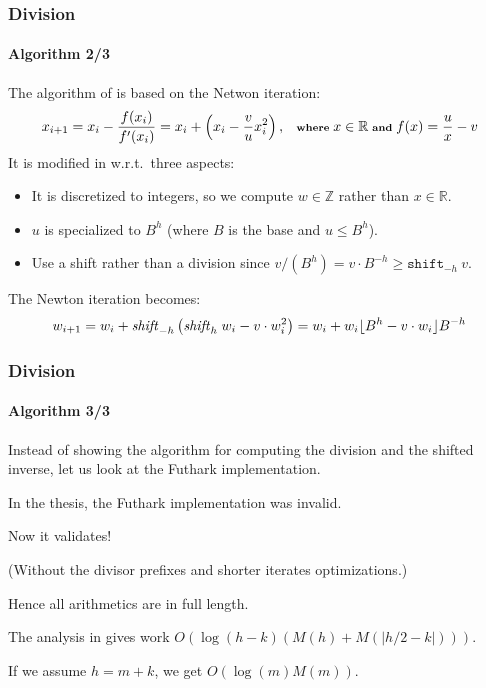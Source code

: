       
\begin{frame}[fragile]
  \frametitle{Division}
  \framesubtitle{Algorithm 2/3}
  The algorithm of \cite{watt2023efficient} is based on the Netwon iteration:\vspace*{-0.5em}
  \begin{equation}\scriptsize
  x_{i+1} = x_i - \dfrac{f(x_i)}{f'(x_i)} = x_i + \left( x_i - \dfrac{v}{u}x^2_i \right),\quad \textbf{where}~x\in \mathbb{R}~ \textbf{and}~ f(x) = \dfrac{u}{x} - v
\end{equation}\pause
It is modified in \cite{watt2023efficient} w.r.t.\ three aspects:
\begin{itemize}\footnotesize
\item It is discretized to integers, so we compute $w\in\mathbb{Z}$ rather than $x\in\mathbb{R}$.\pause
\item $u$ is specialized to $B^h$ (where $B$ is the base and $u \leq B^h$).\pause
\item Use a shift rather than a division since $v/(B^h)=v\cdot B^{-h}\geq \mathtt{shift}_{-h}~v$.
\end{itemize}\pause
The Newton iteration becomes:\vspace*{-0.5em}
\begin{equation}\scriptsize
  w_{i+1} =  w_i + \mathit{shift}_{-h}\left( \mathit{shift}_{h}~w_i - v\cdot w^2_i \right) =  w_i + w_i\lfloor B^h - v\cdot w_i \rfloor B^{-h}
\end{equation}
\end{frame}

\begin{frame}[fragile]
  \frametitle{Division}
  \framesubtitle{Algorithm 3/3}

  Instead of showing the algorithm for computing the division and the shifted
  inverse, let us look at the Futhark implementation.\vspace*{0.75em}\pause

  In the thesis, the Futhark implementation was {\red invalid}.

  Now it {\green validates}!

  (Without the divisor prefixes and shorter iterates optimizations.)\vspace*{0.75em}\pause

  Hence all arithmetics are in full length.

  The analysis in \cite{watt2023efficient} gives work $O(\log (h-k)(M(h)+M(|h/2 - k|)))$.

  If we assume $h=m+k$, we get $O(\log (m)M(m))$.
\end{frame}


